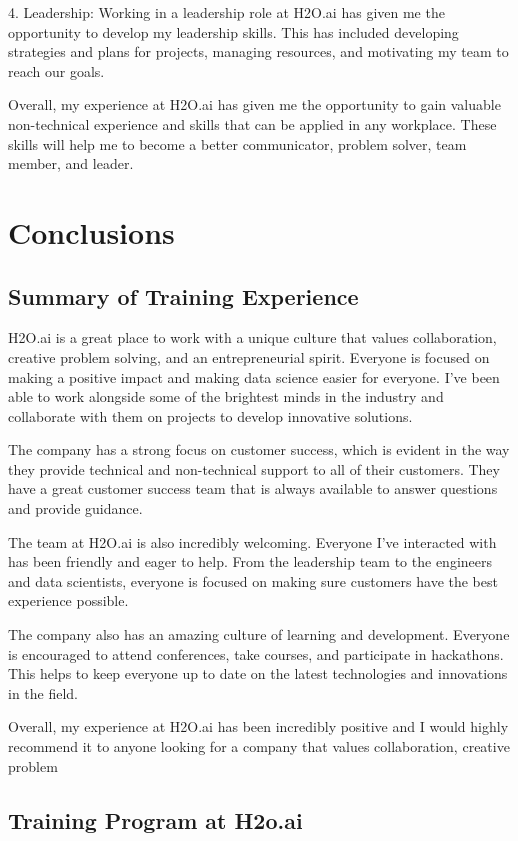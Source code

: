 \documentclass[12pt,a4paper]{report}
\begin{document}
4. Leadership: Working in a leadership role at H2O.ai has given me the opportunity to develop my leadership skills. This has included developing strategies and plans for projects, managing resources, and motivating my team to reach our goals.

Overall, my experience at H2O.ai has given me the opportunity to gain valuable non-technical experience and skills that can be applied in any workplace. These skills will help me to become a better communicator, problem solver, team member, and leader.


\chapter{Conclusions}

\section{Summary of Training Experience}

H2O.ai is a great place to work with a unique culture that values collaboration, creative problem solving, and an entrepreneurial spirit. Everyone is focused on making a positive impact and making data science easier for everyone. I've been able to work alongside some of the brightest minds in the industry and collaborate with them on projects to develop innovative solutions.

The company has a strong focus on customer success, which is evident in the way they provide technical and non-technical support to all of their customers. They have a great customer success team that is always available to answer questions and provide guidance.

The team at H2O.ai is also incredibly welcoming. Everyone I've interacted with has been friendly and eager to help. From the leadership team to the engineers and data scientists, everyone is focused on making sure customers have the best experience possible.

The company also has an amazing culture of learning and development. Everyone is encouraged to attend conferences, take courses, and participate in hackathons. This helps to keep everyone up to date on the latest technologies and innovations in the field.

Overall, my experience at H2O.ai has been incredibly positive and I would highly recommend it to anyone looking for a company that values collaboration, creative problem


\section{Training Program at H2o.ai}
\end{document}
